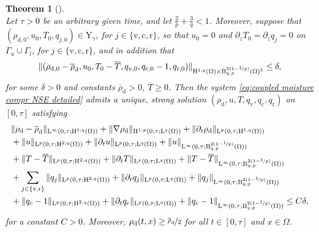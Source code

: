 \documentclass[10pt]{amsart}
\theoremstyle{plain}
\newtheorem{thm}{Theorem}[section]
\theoremstyle{definition}
\theoremstyle{thm}
\numberwithin{equation}{section}
\newcommand{\rL}{\mathrm{L}}
\newcommand{\rLq}{\rL^q}
\newcommand{\rLp}{\rL^p}
\newcommand{\rH}{\mathrm{H}}
\newcommand{\rB}{\mathrm{B}}
\newcommand{\rY}{\mathrm{Y}}
\newcommand{\del}{\partial}
\newcommand{\dz}{\del_z}
\newcommand{\dt}{\del_t}
\newcommand{\Gal}{\Gamma_l}
\newcommand{\Gau}{\Gamma_u}
\newcommand{\rd}{\mathrm{d}}
\newcommand{\rr}{\mathrm{r}}
\newcommand{\rv}{\mathrm{v}}
\newcommand{\rc}{\mathrm{c}}
\begin{document}
\begin{thm}[] \mbox{} \\
    \label{thm: global WP}
     Let $\tau>0$ be an arbitrary given time, and let $\frac{2}{p}+\frac{3}{q}<1$.
     Moreover, suppose that $(\rho_{\rd,0},u_0, T_0, q_{j,0}) \in \rY_\gamma$, for $j\in \{ \rv,\rc,\rr\}$, so that $u_0 = 0$ and $\dz T_0 = \dz q_j = 0$ on~$\Gau \cup \Gal$, for $j \in \{\rv,\rc,\rr\}$, and in addition that
     \begin{equation*}
         \| ( \rho_{\rd,0} - \overline{\rho}_\rd, u_0, T_0 - \overline{T}, q_{\rv,0}, q_{\rc,0}-1, q_{\rr,0} ) \|_{\rH^{1,q}(\Omega) \times  \rB_{q,p}^{2(1-\nicefrac{1}{p})}(\Omega)^5} \leq \delta,
     \end{equation*}
     for some $\delta>0$ and constants $\overline{\rho}_\rd>0$, $\overline{T} \geq0$. 
     Then the system \eqref{eq:coupled moisture compr NSE detailed} admits a unique, strong solution $(\rho_{\rd},u,T,q_\rv,q_\rc,q_\rr)$ on $[0,\tau]$ satisfying
    \begin{equation*}
        \begin{aligned}
            &\| \rho_\rd - \overline{\rho}_\rd \|_{\rL^\infty(0,\tau;\rH^{1,q}(\Omega))} + \| \nabla \rho_\rd \|_{\rH^{1,p}(0,\tau;\rLq(\Omega))} + \| \dt \rho_\rd \|_{\rLp(0,\tau;\rH^{1,q}(\Omega))} \\
            &+ \| u \|_{\rLp(0,\tau;\rH^{2,q}(\Omega))}+ \| \dt u \|_{\rLp(0,\tau;\rLq(\Omega))}+ \| u \|_{\rL^\infty(0,\tau;\rB^{2(1-\nicefrac{1}{p})}_{q,p}(\Omega))} \\ 
            &+\| T-\overline{T} \|_{\rLp(0,\tau;\rH^{2,q}(\Omega))}+ \| \dt T \|_{\rLp(0,\tau;\rLq(\Omega))}+ \| T-\overline{T} \|_{\rL^\infty(0,\tau;\rB^{2(1-\nicefrac{1}{p})}_{q,p}(\Omega))} \\ 
            & + \sum_{j \in \{ \rv,\rr\}} \| q_j \|_{\rLp(0,\tau;\rH^{2,q}(\Omega))}+ \| \dt q_j \|_{\rLp(0,\tau;\rLq(\Omega))}+ \| q_j \|_{\rL^\infty(0,\tau;\rB^{2(1-\nicefrac{1}{p})}_{q,p}(\Omega))} \\
            & +\| q_\rc-1 \|_{\rLp(0,\tau;\rH^{2,q}(\Omega))}+ \| \dt q_\rc \|_{\rLp(0,\tau;\rLq(\Omega))}+ \| q_\rc-1 \|_{\rL^\infty(0,\tau;\rB^{2(1-\nicefrac{1}{p})}_{q,p}(\Omega))}  \leq C\delta,
        \end{aligned}
    \end{equation*}
    for a constant $C>0$. Moreover, $\rho_\rd(t,x) \geq \nicefrac{\overline{\rho}_\rd}{2}$ for all $t \in [0,\tau]$ and $x \in \Omega$.
\end{thm}
\end{document}
